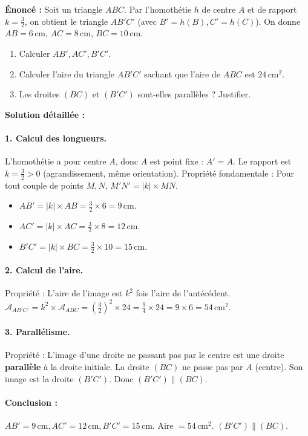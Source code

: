 \documentclass[11pt]{article}
\begin{document}
\begin{exoresolu}
\textbf{Énoncé :} Soit un triangle $ABC$. Par l'homothétie $h$ de centre $A$ et de rapport $k = \frac{3}{2}$, on obtient le triangle $AB'C'$ (avec $B' = h(B), C' = h(C)$).
On donne $AB = 6\,\text{cm}$, $AC = 8\,\text{cm}$, $BC = 10\,\text{cm}$.
\begin{enumerate}
    \item Calculer $AB', AC', B'C'$.
    \item Calculer l'aire du triangle $AB'C'$ sachant que l'aire de $ABC$ est $24\,\text{cm}^2$.
    \item Les droites $(BC)$ et $(B'C')$ sont-elles parallèles ? Justifier.
\end{enumerate}
\tcblower
\textbf{Solution détaillée :}
\paragraph{1. Calcul des longueurs.}
L'homothétie a pour centre $A$, donc $A$ est point fixe : $A' = A$.
Le rapport est $k = \frac{3}{2} > 0$ (agrandissement, même orientation).
Propriété fondamentale : Pour tout couple de points $M, N$, $M'N' = |k| \times MN$.
\begin{itemize}
    \item $AB' = |k| \times AB = \frac{3}{2} \times 6 = 9\,\text{cm}$.
    \item $AC' = |k| \times AC = \frac{3}{2} \times 8 = 12\,\text{cm}$.
    \item $B'C' = |k| \times BC = \frac{3}{2} \times 10 = 15\,\text{cm}$.
\end{itemize}
\paragraph{2. Calcul de l'aire.}
Propriété : L'aire de l'image est $k^2$ fois l'aire de l'antécédent.
$\mathcal{A}_{AB'C'} = k^2 \times \mathcal{A}_{ABC} = \left(\frac{3}{2}\right)^2 \times 24 = \frac{9}{4} \times 24 = 9 \times 6 = 54\,\text{cm}^2$.
\paragraph{3. Parallélisme.}
Propriété : L'image d'une droite ne passant pas par le centre est une droite \textbf{parallèle} à la droite initiale.
La droite $(BC)$ ne passe pas par $A$ (centre). Son image est la droite $(B'C')$.
Donc \textbf{$(B'C') \parallel (BC)$}.
\paragraph{Conclusion :} $AB'=9\,\text{cm}, AC'=12\,\text{cm}, B'C'=15\,\text{cm}$. Aire $= 54\,\text{cm}^2$. $(B'C') \parallel (BC)$.
\end{exoresolu}
\end{document}
